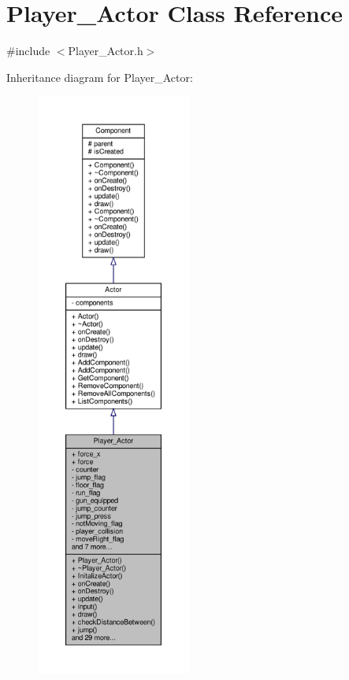\hypertarget{classPlayer__Actor}{}\section{Player\+\_\+\+Actor Class Reference}
\label{classPlayer__Actor}


{\ttfamily \#include $<$Player\+\_\+\+Actor.\+h$>$}



Inheritance diagram for Player\+\_\+\+Actor\+:
\nopagebreak
\begin{figure}[H]
\begin{center}
\leavevmode
\includegraphics[height=550pt]{classPlayer__Actor__inherit__graph}
\end{center}
\end{figure}


